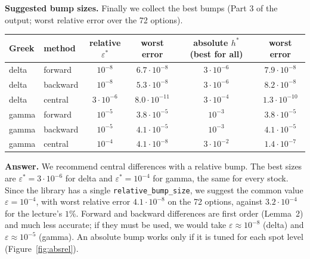 \documentclass[11pt,a4paper]{article}
\newcommand{\ansbox}[1]{\begin{ansboxenv}#1\end{ansboxenv}}
\newcommand{\step}[1]{\par\smallskip\noindent\textbf{#1}\enspace\ignorespaces}
\begin{document}
\step{Suggested bump sizes.} Finally we collect the best bumps (Part 3 of the output; worst relative error over the 72 options).
\begin{center}\small
\renewcommand{\arraystretch}{1.25}
\begin{tabular}{@{}llcccc@{}}
\toprule
Greek & method & relative $\varepsilon^*$ & worst error & absolute $h^*$ (best for all) & worst error\\
\midrule
delta & forward & $10^{-8}$ & $6.7\cdot10^{-8}$ & $3\cdot10^{-6}$ & $7.9\cdot10^{-8}$\\
delta & backward & $10^{-8}$ & $5.3\cdot10^{-8}$ & $3\cdot10^{-6}$ & $8.2\cdot10^{-8}$\\
delta & central & $3\cdot10^{-6}$ & $8.0\cdot10^{-11}$ & $3\cdot10^{-4}$ & $1.3\cdot10^{-10}$\\
gamma & forward & $10^{-5}$ & $3.8\cdot10^{-5}$ & $10^{-3}$ & $3.8\cdot10^{-5}$\\
gamma & backward & $10^{-5}$ & $4.1\cdot10^{-5}$ & $10^{-3}$ & $4.1\cdot10^{-5}$\\
gamma & central & $10^{-4}$ & $4.1\cdot10^{-8}$ & $3\cdot10^{-2}$ & $1.4\cdot10^{-7}$\\
\bottomrule
\end{tabular}
\end{center}

\ansbox{\textbf{Answer.} We recommend central differences with a relative bump. The best sizes are $\varepsilon^*=3\cdot10^{-6}$ for delta and $\varepsilon^*=10^{-4}$ for gamma, the same for every stock. Since the library has a single \texttt{relative\_bump\_size}, we suggest the common value $\varepsilon=10^{-4}$, with worst relative error $4.1\cdot10^{-8}$ on the 72 options, against $3.2\cdot10^{-4}$ for the lecture's $1\%$. Forward and backward differences are first order (Lemma~2) and much less accurate; if they must be used, we would take $\varepsilon\approx10^{-8}$ (delta) and $\varepsilon\approx10^{-5}$ (gamma). An absolute bump works only if it is tuned for each spot level (Figure~\ref{fig:absrel}).}
\end{document}
